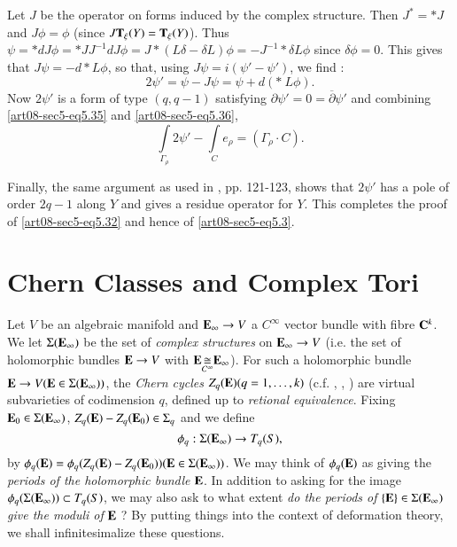 Let $J$ be the operator on forms induced by the complex structure. Then $J^{*}=*J$ and $J\phi=\phi$ (since $J\mathbf{T}_{\xi}(Y)=\mathbf{T}_{\xi}(Y)$). Thus $\psi=*dJ\phi=*JJ^{-1}dJ\phi=J*(L\delta-\delta L)\phi=-J^{-1}*\delta L\phi$ since $\delta\phi=0$. This gives that $J\psi=-d*L\phi$, so that, using $J\psi=i(\psi'-\psi')$, we find :
\begin{equation}
2\psi'=\psi-J\psi=\psi+d(* \ L\phi).\label{art08-sec5-eq5.36}
\end{equation}\pageoriginale
Now $2\psi'$ is a form of type $(q,q-1)$ satisfying $\partial \psi'=0=\overline{\partial}\psi'$ and combining \eqref{art08-sec5-eq5.35} and \eqref{art08-sec5-eq5.36},
\begin{equation}
\int\limits_{\Gamma_{\rho}}2\psi'-\int\limits_{C}e_{\rho}=(\Gamma_{\rho}\cdot C).\label{art08-sec5-eq5.37}
\end{equation}

Finally, the same argument as used in \cite{art08-key17}, pp. 121-123, shows that $2\psi'$ has a pole of order $2q-1$ along $Y$ and gives a residue operator for $Y$. This completes the proof of \eqref{art08-sec5-eq5.32} and hence of \eqref{art08-sec5-eq5.3}.

\section{Chern Classes and Complex Tori}\label{art08-sec6}

Let $V$ be an algebraic manifold and $\mathbf{E}_{\infty}\to V$ a $C^{\infty}$ vector bundle with fibre $\mathbf{C}^{k}$. We let $\Sigma(\mathbf{E}_{\infty})$ be the set of {\em complex structures} on $\mathbf{E}_{\infty}\to V$ (i.e. the set of holomorphic bundles $\mathbf{E}\to V$ with $\mathbf{E}\displaystyle{\mathop{\cong}\limits_{C^{\infty}}}\mathbf{E}_{\infty}$). For such a holomorphic bundle $\mathbf{E}\to V(\mathbf{E}\in \Sigma(\mathbf{E}_{\infty}))$, the {\em Chern cycles} $Z_{q}(\mathbf{E})(q=1,\ldots,k)$ (c.f. \cite{art08-key11}, \cite{art08-key12}, \cite{art08-key13}) are virtual subvarieties of codimension $q$, defined up to {\em retional equivalence}. Fixing $\mathbf{E}_{0}\in \Sigma(\mathbf{E}_{\infty})$, $Z_{q}(\mathbf{E})-Z_{q}(\mathbf{E}_{0})\in \Sigma_{q}$ and we define
\setcounter{equation}{0}
\begin{equation}
\phi_{q}:\Sigma(\mathbf{E}_{\infty})\to T_{q}(S),\label{art08-sec6-eq6.1}
\end{equation}
by $\phi_{q}(\mathbf{E})=\phi_{q}(Z_{q}(\mathbf{E})-Z_{q}(\mathbf{E}_{0}))(\mathbf{E}\in \Sigma(\mathbf{E}_{\infty}))$. We may think of $\phi_{q}(\mathbf{E})$ as giving the {\em periods of the holomorphic bundle} $\mathbf{E}$. In addition to asking for the image $\phi_{q}(\Sigma(\mathbf{E}_{\infty}))\subset T_{q}(S)$, we may also ask to what extent {\em do the periods of} $\{\mathbf{E}\}\in \Sigma(\mathbf{E}_{\infty})$ {\em give the moduli of} $\mathbf{E}$ ? By putting things into the context of deformation theory, we shall infinitesimalize these questions.

